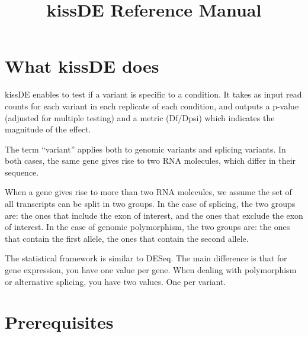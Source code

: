 \documentclass[english, a4paper, 12pt]{article}
\title{kissDE Reference Manual}
\author{}
\begin{document}
\maketitle

\section{What kissDE does}
kissDE enables to test if a variant is specific to a condition.
It takes as input read counts for each variant in each replicate of each condition, and outputs a p-value (adjusted for multiple testing) and a metric (Df/Dpsi) which indicates the magnitude of the effect.

The term ``variant'' applies both to genomic variants and splicing variants.
In both cases, the same gene gives rise to two RNA molecules, which differ in their sequence.

When a gene gives rise to more than two RNA molecules, we assume the set of all transcripts can be split in two groups.
In the case of splicing, the two groups are: the ones that include the exon of interest, and the ones that exclude the exon of interest.
In the case of genomic polymorphism, the two groups are: the ones that contain the first allele, the ones that contain the second allele.

The statistical framework is similar to DESeq.
The main difference is that for gene expression, you have one value per gene. 
When dealing with polymorphism or alternative splicing, you have two values. One per variant.



\section{Prerequisites}
\end{document}
